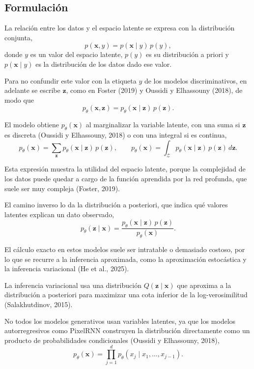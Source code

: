 \documentclass[11pt,letterpaper]{article}
\theoremstyle{definition}
\newcommand{\bx}{\mathbf{x}}
\newcommand{\bz}{\mathbf{z}}
\newcommand{\ptheta}{p_{\theta}}
\begin{document}
\subsection{Formulación}

La relación entre los datos y el espacio latente se expresa con la distribución conjunta,
\begin{equation}
  p(\bx, y) = p(\bx \mid y)\, p(y),
\end{equation}
donde $y$ es un valor del espacio latente, $p(y)$ es su distribución a priori y $p(\bx \mid y)$ es la distribución de los datos dado ese valor.

Para no confundir este valor con la etiqueta $y$ de los modelos discriminativos, en adelante se escribe $\bz$, como en Foster (2019) y Oussidi y Elhassouny (2018), de modo que
\begin{equation}
  \ptheta(\bx, \bz) = \ptheta(\bx \mid \bz)\, p(\bz).
\end{equation}

El modelo obtiene $\ptheta(\bx)$ al marginalizar la variable latente, con una suma si $\bz$ es discreta (Oussidi y Elhassouny, 2018) o con una integral si es continua,
\begin{equation}
  \ptheta(\bx) = \sum_{\bz} \ptheta(\bx \mid \bz)\, p(\bz), \qquad \ptheta(\bx) = \int_{\mathcal{Z}} \ptheta(\bx \mid \bz)\, p(\bz)\, d\bz.
  \label{eq:marginal}
\end{equation}

Esta expresión muestra la utilidad del espacio latente, porque la complejidad de los datos puede quedar a cargo de la función aprendida por la red profunda, que suele ser muy compleja (Foster, 2019).

El camino inverso lo da la distribución a posteriori, que indica qué valores latentes explican un dato observado,
\begin{equation}
  \ptheta(\bz \mid \bx) = \frac{\ptheta(\bx \mid \bz)\, p(\bz)}{\ptheta(\bx)}.
\end{equation}

El cálculo exacto en estos modelos suele ser intratable o demasiado costoso, por lo que se recurre a la inferencia aproximada, como la aproximación estocástica y la inferencia variacional (He et al., 2025).

La inferencia variacional usa una distribución $Q(\bz \mid \bx)$ que aproxima a la distribución a posteriori para maximizar una cota inferior de la log-verosimilitud (Salakhutdinov, 2015).

No todos los modelos generativos usan variables latentes, ya que los modelos autorregresivos como PixelRNN construyen la distribución directamente como un producto de probabilidades condicionales (Oussidi y Elhassouny, 2018),
\begin{equation}
  \ptheta(\bx) = \prod_{j=1}^{d} \ptheta(x_j \mid x_1, \dots, x_{j-1}).
\end{equation}
\end{document}
